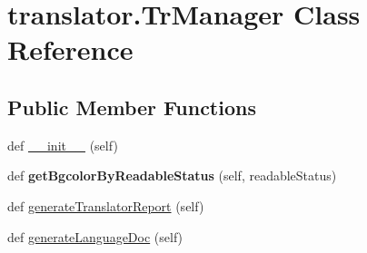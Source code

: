 \hypertarget{classtranslator_1_1_tr_manager}{}\section{translator.\+Tr\+Manager Class Reference}
\label{classtranslator_1_1_tr_manager}
\subsection*{Public Member Functions}
\begin{DoxyCompactItemize}
\item 
def \mbox{\hyperlink{classtranslator_1_1_tr_manager_af2b5c2c3fa0db925e084b057baf62041}{\+\_\+\+\_\+init\+\_\+\+\_\+}} (self)
\item 
\mbox{\label{classtranslator_1_1_tr_manager_a78ac044c68bc34dae3eb194b8a53aa3b}} 
def {\bfseries get\+Bgcolor\+By\+Readable\+Status} (self, readable\+Status)
\item 
def \mbox{\hyperlink{classtranslator_1_1_tr_manager_a84aba0e70020862ec40a29909de43687}{generate\+Translator\+Report}} (self)
\item 
def \mbox{\hyperlink{classtranslator_1_1_tr_manager_a61f10f267ebea913b1533ad9ad786753}{generate\+Language\+Doc}} (self)
\end{DoxyCompactItemize}
